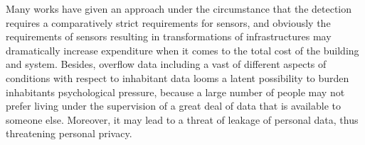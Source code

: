 Many works have given an approach under the circumstance that the
detection requires a comparatively strict requirements for sensors,
and obviously the requirements of sensors resulting in transformations
of infrastructures may dramatically increase expenditure when it comes
to the total cost of the building and system. Besides, overflow data
including a vast of different aspects of conditions with respect to
inhabitant data looms a latent possibility to burden inhabitants
psychological pressure, because a large number of people may not
prefer living under the supervision of a great deal of data that is
available to someone else. Moreover, it may lead to a threat of
leakage of personal data, thus threatening personal privacy.



